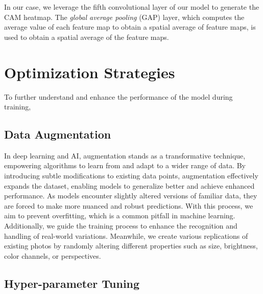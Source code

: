 In our case, we leverage the fifth convolutional layer of our model to generate the CAM heatmap.
The \textit{global average pooling} (GAP) layer, 
which computes the average value of each feature map to obtain a spatial average of feature maps, 
is used to obtain a spatial average of the feature maps. 

\section{Optimization Strategies}
\label{sec:optim}

To further understand and enhance the performance of the model during training, 

\subsection{Data Augmentation}
\label{sec:optim:aug}

In deep learning and AI, 
augmentation stands as a transformative technique, 
empowering algorithms to learn from and adapt to a wider range of data. 
By introducing subtle modifications to existing data points, 
augmentation effectively expands the dataset, 
enabling models to generalize better and achieve enhanced performance. 
As models encounter slightly altered versions of familiar data, 
they are forced to make more nuanced and robust predictions. 
With this process, we aim to prevent overfitting, which is a common pitfall in machine learning. 
Additionally, we guide the training process to enhance the recognition and handling of real-world variations.
Meanwhile, we create various replications of existing photos by randomly altering different properties such as size, brightness, color channels, or perspectives.

\subsection{Hyper-parameter Tuning}
\label{sec:optim:tuning}

